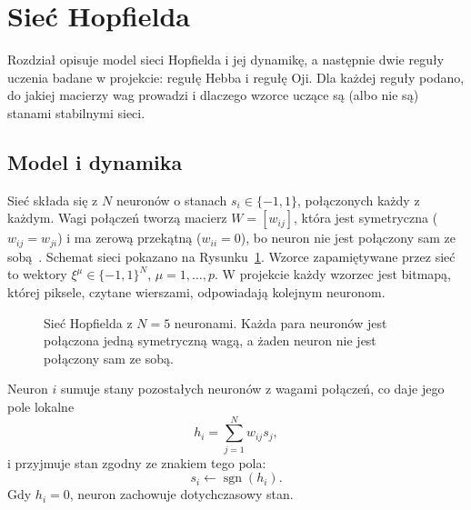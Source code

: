 \section{Sieć Hopfielda}
\label{sec:siec-hopfielda}

Rozdział opisuje model sieci Hopfielda i jej dynamikę, a następnie dwie reguły uczenia badane w projekcie: regułę Hebba i regułę Oji. Dla każdej reguły podano, do jakiej macierzy wag prowadzi i dlaczego wzorce uczące są (albo nie są) stanami stabilnymi sieci.

\subsection{Model i dynamika}
\label{sec:model}

Sieć składa się z $N$ neuronów o stanach $s_i \in \{-1, 1\}$, połączonych każdy z każdym. Wagi połączeń tworzą macierz $W = [w_{ij}]$, która jest symetryczna ($w_{ij} = w_{ji}$) i ma zerową przekątną ($w_{ii} = 0$), bo neuron nie jest połączony sam ze sobą~\cite[s.~343--344]{rojas1996}. Schemat sieci pokazano na Rysunku~\ref{fig:siec-hopfielda}. Wzorce zapamiętywane przez sieć to wektory $\xi^\mu \in \{-1, 1\}^N$, $\mu = 1, \ldots, p$. W projekcie każdy wzorzec jest bitmapą, której piksele, czytane wierszami, odpowiadają kolejnym neuronom.

\begin{figure}[H]
    \centering
    \ifrysunki
    \fi
    \caption{Sieć Hopfielda z $N = 5$ neuronami. Każda para neuronów jest połączona jedną symetryczną wagą, a żaden neuron nie jest połączony sam ze sobą.}
    \label{fig:siec-hopfielda}
\end{figure}

\noindent Neuron $i$ sumuje stany pozostałych neuronów z wagami połączeń, co daje jego pole lokalne
\begin{equation}
    h_i = \sum_{j=1}^{N} w_{ij} s_j,
    \label{eq:pole}
\end{equation}
i przyjmuje stan zgodny ze znakiem tego pola:
\begin{equation}
    s_i \leftarrow \operatorname{sgn}(h_i).
    \label{eq:aktualizacja}
\end{equation}
Gdy $h_i = 0$, neuron zachowuje dotychczasowy stan.

